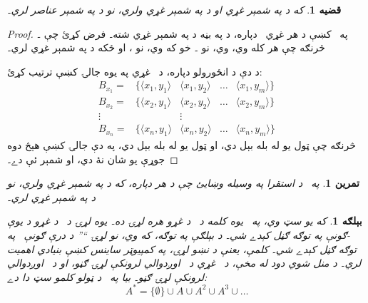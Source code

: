 \documentclass[12pt,a4paper,oneside]{report}
\newcommand{\Setabs}[2]{\{#1 : #2\}}
\newcommand{\tuple}[1]{\langle #1\rangle}
\newcommand{\ollabel}[1]{\label{\pspart:\pschapter:\pssection:#1}}
\newtheorem{ex}[defn]{بېلګه}
\newtheorem{prop}[defn]{قضيه}
\newtheorem{prob}[defn]{تمرين}
\begin{document}
\begin{prop}\ollabel{cardnmprod}
که  د  په شمېر غړي او  د  په شمېر غړي ولري، نو  د  په شمېر عناصر لري۔
\end{prop}

\begin{proof}
په~ کښې د هر غړي~ دپاره، د \LR{$\tuple{x, y} \in A \times B$} په بڼه د  په شمېر غړي شته۔ فرض کړئ چې \LR{$B_x = \Setabs{\tuple{x, y}}{y \in B}$}۔ څرنګه چې هر کله  وي، \LR{$\tuple{x_1, y} \neq \tuple{x_2, y}$} وي، نو ۔ خو که  وي، نو ، او ځکه د  په شمېر غړي لري۔

د دې د انځورولو دپاره، د~ غړي په يوه جالۍ کښې ترتيب کړئ:
\[
\begin{array}{rcccc}
  B_{x_1} = & \{\tuple{x_1, y_1} & \tuple{x_1, y_2} & \dots & \tuple{x_1, y_m}\}\\
  B_{x_2} = & \{\tuple{x_2, y_1} & \tuple{x_2, y_2} & \dots & \tuple{x_2, y_m}\}\\
  \vdots & & \vdots\\
  B_{x_n} = & \{\tuple{x_n, y_1} & \tuple{x_n, y_2} & \dots & \tuple{x_n, y_m}\}
\end{array}
\]
څرنګه چې ټول  يو له بله بېل دي، او ټول  يو له بله بېل دي، په دې جالۍ کښې هېڅ دوه جوړې يو شان نۀ دي، او شمېر ئې  دے۔
\end{proof}

\begin{prob}
په~ د استقرا په وسيله وښايئ چې د هر  دپاره، که  د  په شمېر غړي ولري، نو  د  په شمېر غړي لري۔
\end{prob}

\begin{ex}
که  يو سټ وي، په~ يوه \emph{کلمه} د~ د غړو هره لړۍ ده۔ يوه لړۍ د~ د غړو د يوې -ګونې په توګه ګڼل کېدے شي۔ د بېلګې په توګه، که  وي، نو لړۍ ``'' د درې ګونې~\LR{$\tuple{b, a, c}$} په توګه ګڼل کېدے شي۔ کلمې، يعنې د نښو لړۍ، په کمپيوټر ساينس کښې بنيادي اهميت لري۔ د منل شوي دود له مخې، د~ غړي د~ اوږدوالي لرونکې لړۍ ګڼو، او \LR{$\emptyset$} د~ اوږدوالي لرونکې لړۍ ګڼو۔ بيا په~ د \emph{ټولو} کلمو سټ دا دے:
\[
A^* = \{\emptyset\} \cup A \cup A^2 \cup A^3 \cup \dots
\]
\end{ex}
\end{document}
